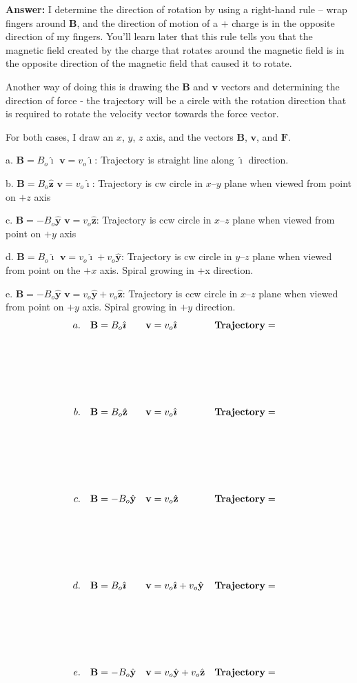 \documentclass{article}
\newcommand{\ihat}[0]{\hat{\boldsymbol{\imath}}}
\newcommand{\yhat}[0]{\hat{\mathbf{y}}}
\newcommand{\zhat}[0]{\hat{\mathbf{z}}}
\begin{document}
\ifsolutions
{\bf Answer:} I determine the direction of rotation by using a right-hand rule -- wrap fingers around $\mathbf{B}$, and the direction of motion of a $+$ charge is in the opposite direction of my fingers. You'll learn later that this rule tells you that the magnetic field created by the charge that rotates around the magnetic field is in the opposite direction of the magnetic field that caused it to rotate.

Another way of doing this is drawing the $\mathbf{B}$ and $\mathbf{v}$ vectors and determining the direction of force - the trajectory will be a circle with the rotation direction that is required to rotate the velocity vector towards the force vector.

For both cases, I draw an $x$, $y$, $z$ axis, and the vectors $\mathbf{B}$, $\mathbf{v}$, and $\mathbf{F}$.

a. $\mathbf{B} =  B_o\ihat$  $\mathbf{v} = v_o\ihat$: Trajectory is straight line along $\ihat$ direction.

b. $\mathbf{B} =  B_o\zhat$ $\mathbf{v} = v_o\ihat$: Trajectory is cw circle in $x$--$y$ plane when viewed from point on $+z$ axis

c. $\mathbf{B} = -B_o\yhat$ $\mathbf{v} = v_o\zhat$: Trajectory is ccw circle in $x$--$z$ plane when viewed from point on $+y$ axis

d. $\mathbf{B} = B_o\ihat $ $\mathbf{v} = v_o\ihat+v_o\yhat$: Trajectory is cw circle in $y$--$z$ plane when viewed from point on the $+x$ axis. Spiral growing in +x direction.

e. $\mathbf{B} = -B_o\yhat$ $\mathbf{v} = v_o\yhat+v_o\zhat$: Trajectory is ccw circle in $x$--$z$ plane when viewed from point on $+y$ axis. Spiral growing in $+y$ direction.
\else
$$
\begin{align*}
a.\quad & \mathbf{B} =  B_o\ihat&  \mathbf{v} &= v_o\ihat & & \bf{Trajectory =} \\\\\\\\ \\\\
b.\quad & \mathbf{B} =  B_o\zhat &  \mathbf{v} & = v_o\ihat& &  \bf{Trajectory =} \\\\\\\\ \\\\
c.\quad  & \mathbf{B} = -B_o\yhat & \mathbf{v} & = v_o\zhat& & \bf{Trajectory =} \\\\\\\\ \\\\
d.\quad  & \mathbf{B} = B_o\ihat & \mathbf{v} & = v_o\ihat+v_o\yhat& &\bf{Trajectory =}\\\\\\\\ \\\\
e.\quad  & \mathbf{B} = -B_o\yhat & \mathbf{v} & = v_o\yhat+v_o\zhat& & \bf{Trajectory =} & 
\end{align*}
$$
\fi
\end{document}
